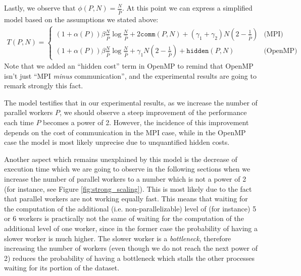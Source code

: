 \documentclass{article}
\begin{document}
Lastly, we observe that $\phi(P,N) = \frac{N}{\hat{P}}$. At this point we can
express a simplified model based on the assumptions we stated above:
\begin{gather*}
    T(P,N) = \begin{cases}
        (1+\alpha(P)) \beta \frac{N}{\hat{P}} \log \frac{N}{\hat{P}} + 2\texttt{comm}(P,N) + (\gamma_1 + \gamma_2) N \left(2 - \frac{1}{\hat{P}}\right) &\text{(MPI)}\\
        (1+\alpha(P)) \beta \frac{N}{\hat{P}} \log \frac{N}{\hat{P}} + \gamma_1 N \left(2 - \frac{1}{\hat{P}}\right) + \texttt{hidden}(P,N) &\text{(OpenMP)}
    \end{cases}
\end{gather*}
Note that we added an ``hidden cost'' term in OpenMP to remind that OpenMP isn't
just ``MPI \emph{minus} communication'', and the experimental results are going
to remark strongly this fact.

The model testifies that in our experimental results, as we increase the number
of parallel workers $P$, we should observe a steep improvement of the
performance each time $P$ becomes a power of 2. However, the incidence of this
improvement depends on the cost of communication in the MPI case, while in the
OpenMP case the model is most likely unprecise due to unquantified hidden
costs.

Another aspect which remains unexplained by this model is the decrease of
execution time which we are going to observe in the following sections when
we increase the number of parallel workers to a number which is not a power of
2 (for instance, see Figure \ref{fig:strong_scaling}). This is most likely due
to the fact that parallel workers are not working equally fast. This means
that waiting for the computation of the additional (i.e. non-parallelizable)
level of (for instance) 5 or 6 workers is practically not the same of waiting
for the computation of the additional level of one worker, since in the former
case the probability of having a slower worker is much higher. The slower worker
is a \emph{bottleneck}, therefore increasing the number of workers (even though
we do not reach the next power of 2) reduces the probability of having a
bottleneck which stalls the other processes waiting for its portion of the
dataset.
\end{document}
